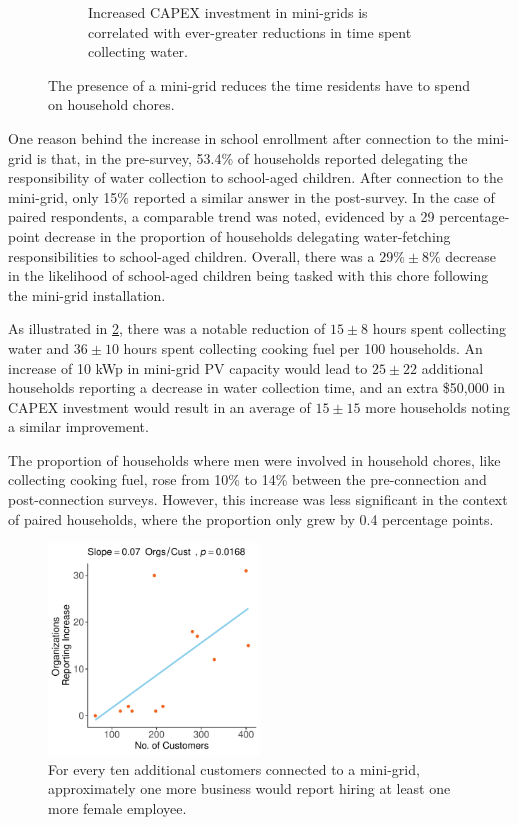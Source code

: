 \begin{figure}[t]
\begin{subfigure}[t]{0.48\textwidth}
		\caption{Increased CAPEX investment in mini-grids is correlated with ever-greater reductions in time spent collecting water.}
		\label{fig:water_collection}
	\end{subfigure}
	\caption{The presence of a mini-grid reduces the time residents have to spend on household chores.}
	\label{fig:water-and-fuel-collection}
\end{figure}

One reason behind the increase in school enrollment after connection to the mini-grid is that, in the pre-survey, 53.4\% of households reported delegating the responsibility of water collection to school-aged children. After connection to the mini-grid, only 15\% reported a similar answer in the post-survey. In the case of paired respondents, a comparable trend was noted, evidenced by a 29 percentage-point decrease in the proportion of households delegating water-fetching responsibilities to school-aged children. Overall, there was a $29\%\pm8\%$ decrease in the likelihood of school-aged children being tasked with this chore following the mini-grid installation.

As illustrated in \cref{fig:water-and-fuel-collection}, there was a notable reduction of $15\pm8$ hours spent collecting water and $36\pm10$ hours spent collecting cooking fuel per 100 households. An increase of 10 kWp in mini-grid PV capacity would lead to $25\pm22$ additional households reporting a decrease in water collection time, and an extra \$50,000 in CAPEX investment would result in an average of $15\pm15$ more households noting a similar improvement.

The proportion of households where men were involved in household chores, like collecting cooking fuel, rose from 10\% to 14\% between the pre-connection and post-connection surveys. However, this increase was less significant in the context of paired households, where the proportion only grew by 0.4 percentage points.

\begin{figure}[t]
	\centering
	\includegraphics[width=0.5\textwidth]{images/hired_women_regression_community.pdf}
	\caption{For every ten additional customers connected to a mini-grid, approximately one more business would report hiring at least one more female employee.}
	\label{fig:women_employment}
\end{figure}

